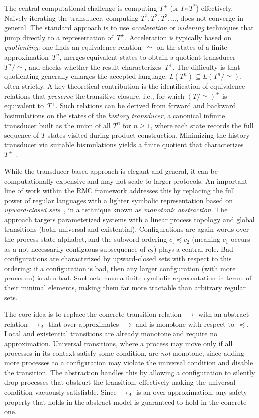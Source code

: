 The central computational challenge is computing $T^+$ (or $I \circ T^*$)
effectively. Naively iterating the transducer, computing $T^1, T^2, T^3,
\ldots$, does not converge in general. The standard approach is to use
\emph{acceleration} or \emph{widening} techniques that jump directly to a
representation of~$T^+$. Acceleration is typically based on
\emph{quotienting}: one finds an equivalence relation~$\simeq$ on the states
of a finite approximation~$T^n$, merges equivalent states to obtain a
quotient transducer $T^n/{\simeq}$, and checks whether the result
characterizes~$T^+$. The difficulty is that quotienting generally enlarges
the accepted language: $L(T^n) \subseteq L(T^n/{\simeq})$, often strictly. A
key theoretical contribution is the identification of equivalence relations
that \emph{preserve} the transitive closure, i.e., for which
$(T/{\simeq})^+$ is equivalent to~$T^+$. Such relations can be derived from
forward and backward bisimulations on the states of the \emph{history
transducer}, a canonical infinite transducer built as the union of all
$T^n$ for $n \geq 1$, where each state records the full sequence of
$T$-states visited during product construction. Minimizing the history
transducer via suitable bisimulations yields a finite quotient that
characterizes~$T^+$~\cite{BJND03,AJNO02}.

While the transducer-based approach is elegant and general, it can be
computationally expensive and may not scale to larger protocols. An important
line of work within the RMC framework addresses this by replacing the full
power of regular languages with a lighter symbolic representation based on
\emph{upward-closed sets}~\cite{Abd10}, in a technique known as
\emph{monotonic abstraction}. The approach targets parameterized systems with
a linear process topology and global transitions (both universal and
existential). Configurations are again words over the process state alphabet,
and the subword ordering $c_1 \preceq c_2$ (meaning $c_1$ occurs as a
not-necessarily-contiguous subsequence of $c_2$) plays a central role. Bad
configurations are characterized by upward-closed sets with respect to this
ordering: if a configuration is bad, then any larger configuration (with more
processes) is also bad. Such sets have a finite symbolic representation in
terms of their minimal elements, making them far more tractable than arbitrary
regular sets.

The core idea is to replace the concrete transition relation~$\to$ with an
abstract relation~$\to_A$ that over-approximates~$\to$ and is monotone with
respect to~$\preceq$. Local and existential transitions are already monotone
and require no approximation. Universal transitions, where a process may
move only if all processes in its context satisfy some condition, are
\emph{not} monotone, since adding more processes to a configuration may
violate the universal condition and disable the transition. The abstraction
handles this by allowing a configuration to silently drop processes that
obstruct the transition, effectively making the universal condition vacuously
satisfiable. Since $\to_A$ is an over-approximation, any safety property
that holds in the abstract model is guaranteed to hold in the concrete one.

